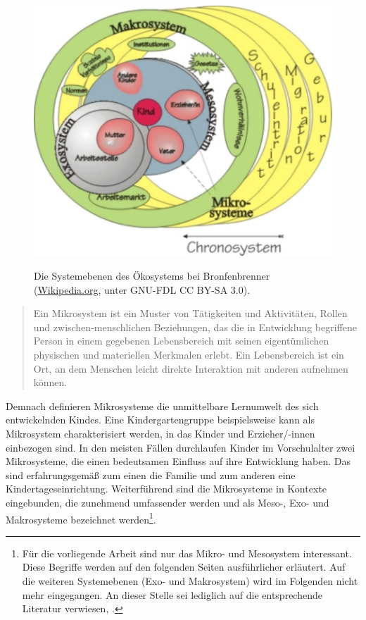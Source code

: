 \documentclass[12pt,a4paper]{article}
\begin{document}
\begin{figure}[h]
\caption{Die Systemebenen des Ökosystems bei Bronfenbrenner (\href{https://de.wikipedia.org/wiki/Datei:\%C3\%96kosystemBronfenbrenner.jpg}{Wikipedia.org}, unter GNU-FDL CC BY-SA 3.0).}
\centering
\includegraphics[scale=0.68]{figures/OekosystemBronfenbrenner}
\label{fig_bronf}
\end{figure}
\pagebreak
\begin{quote}
\begin{doublespace}
Ein Mikrosystem ist ein Muster von Tätigkeiten und Aktivitäten, Rollen und zwischen-menschlichen Beziehungen, das die in Entwicklung begriffene Person in einem gegebenen Lebensbereich mit seinen eigentümlichen physischen und materiellen Merkmalen erlebt. Ein Lebensbereich ist ein Ort, an dem Menschen leicht direkte Interaktion mit anderen aufnehmen können.~\parencite[S.~38]{Bronfenbrenner}
\end{doublespace}
\end{quote}
Demnach definieren Mikrosysteme die unmittelbare Lernumwelt des sich entwickelnden Kindes. Eine Kindergartengruppe beispielsweise kann als Mikrosystem charakterisiert werden, in das Kinder und Erzieher/-innen einbezogen sind. In den meisten Fällen durchlaufen Kinder im Vorschulalter zwei Mikrosysteme, die einen bedeutsamen Einfluss auf ihre Entwicklung haben. Das sind erfahrungsgemäß zum einen die Familie und zum anderen eine Kindertageseinrichtung. Weiterführend sind die Mikrosysteme in Kontexte eingebunden, die zunehmend umfassender werden und als Meso-, Exo- und Makrosysteme bezeichnet werden\footnote{Für die vorliegende Arbeit sind nur das Mikro- und Mesosystem interessant. Diese Begriffe werden auf den folgenden Seiten ausführlicher erläutert. Auf die weiteren Systemebenen (Exo- und Makrosystem) wird im Folgenden nicht mehr eingegangen. An dieser Stelle sei lediglich auf die entsprechende Literatur verwiesen, \textcite{Bronfenbrenner}.}. 
\end{document}
